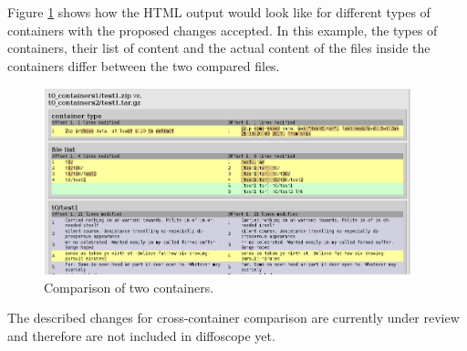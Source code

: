 {Figure \ref{fig:containers} shows how the HTML output would look like for different types of containers with the proposed changes accepted. In this example, the types of containers, their list of content and the actual content of the files inside the containers differ between the two compared files.
\FloatBarrier

\begin{figure}
\centering
\includegraphics[width=0.95\textwidth]{fig/containers_new.png}
\caption{\label{fig:containers}Comparison of two containers.}
\end{figure}

The described changes for cross-container comparison are currently under review and therefore are not included in diffoscope yet.
}


